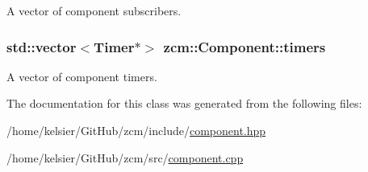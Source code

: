 A vector of component subscribers. 

\hypertarget{classzcm_1_1Component_a506eac4aebc9e02f0df246afbbac7d75}{
\subsubsection[{timers}]{\setlength{\rightskip}{0pt plus 5cm}std\-::vector$<${\bf Timer}$\ast$$>$ zcm\-::\-Component\-::timers\hspace{0.3cm}{\ttfamily [protected]}}}\label{classzcm_1_1Component_a506eac4aebc9e02f0df246afbbac7d75}


A vector of component timers. 



The documentation for this class was generated from the following files\-:\begin{DoxyCompactItemize}
\item 
/home/kelsier/\-Git\-Hub/zcm/include/\hyperlink{component_8hpp}{component.\-hpp}\item 
/home/kelsier/\-Git\-Hub/zcm/src/\hyperlink{component_8cpp}{component.\-cpp}\end{DoxyCompactItemize}
